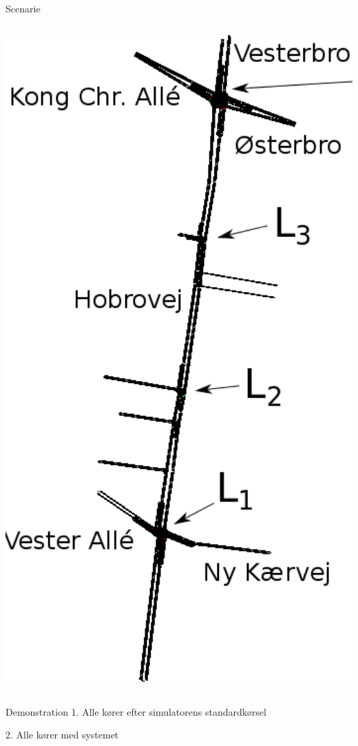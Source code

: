 \begin{frame}{Scenarie}
\begin{columns}
\begin{column}{0.4\textwidth}
\includegraphics[width=1\textwidth]{images/Hobrovej.png}
\end{column}
\end{columns}
\end{frame}

\begin{frame}{Demonstration}
1. Alle kører efter simulatorens standardkørsel

2. Alle kører med systemet
\end{frame}